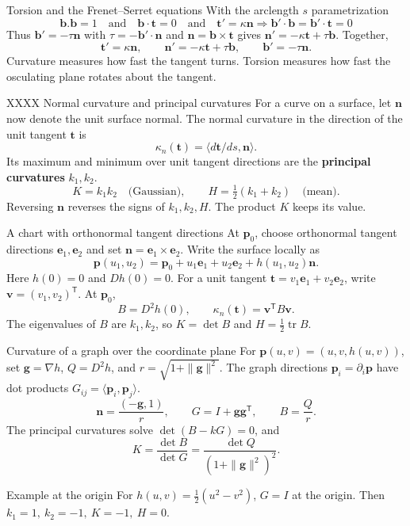 \documentclass[11pt,aspectratio=169]{beamer}
\newcommand{\vect}[1]{\bm{#1}}
\newcommand{\pair}[2]{\langle #1,#2\rangle}
\begin{document}
\begin{frame}{Torsion and the Frenet--Serret equations}
With the arclength $s$ parametrization
 \[
 \boxed{
 	\vect{b}.\vect{b}=1
 \quad \mbox{and} \quad
 \vect{b}\cdot\vect{t}=0
 \quad \mbox{and} \quad
 \vect{t}'=\kappa\vect{n}
 } 
 \Longrightarrow
 \boxed{\vect{b}'\cdot\vect{b}=\vect{b}'\cdot\vect{t}=0}
 \]
Thus \(\vect{b}'=-\tau\vect{n}\) with
\(\tau=-\vect{b}'\cdot\vect{n}\) and 
 \(\vect{n}=\vect{b}\times\vect{t}\) 
gives
\(\vect{n}'=-\kappa\vect{t}+\tau\vect{b}\). Together,
\[
 \boxed{\vect{t}'=\kappa\vect{n},\qquad
        \vect{n}'=-\kappa\vect{t}+\tau\vect{b},\qquad
        \vect{b}'=-\tau\vect{n}.}
\]
Curvature measures how fast the tangent turns. Torsion measures 
how fast the osculating plane rotates about the tangent.
\end{frame}

\begin{frame}{XXXX Normal curvature and principal curvatures}
For a curve on a surface, let \(\vect{n}\) now denote the unit surface normal.
The normal curvature in the direction of the unit tangent \(\vect{t}\) is
\[
    \kappa_n(\vect{t})=\pair{d\vect{t}/ds}{\vect{n}}.
\]
Its maximum and minimum over unit tangent directions are the
\textbf{principal curvatures} \(k_1,k_2\).
\[
    K=k_1k_2 \quad\text{(Gaussian)},\qquad
    H=\tfrac12(k_1+k_2) \quad\text{(mean)}.
\]
Reversing \(\vect{n}\) reverses the signs of \(k_1,k_2,H\).
The product \(K\) keeps its value.
\end{frame}

\begin{frame}{A chart with orthonormal tangent directions}
At \(\vect{p}_0\), choose orthonormal tangent directions
\(\vect{e}_1,\vect{e}_2\) and set \(\vect{n}=\vect{e}_1\times\vect{e}_2\).
Write the surface locally as
\[
 \vect{p}(u_1,u_2)=\vect{p}_0+u_1\vect{e}_1+u_2\vect{e}_2+h(u_1,u_2)\vect{n}.
\]
Here \(h(0)=0\) and \(Dh(0)=0\).
For a unit tangent \(\vect{t}=v_1\vect{e}_1+v_2\vect{e}_2\),
write \(\vect{v}=(v_1,v_2)^{\mathsf T}\). At \(\vect{p}_0\),
\[
    B=D^2h(0),\qquad \kappa_n(\vect{t})=\vect{v}^{\mathsf T}B\vect{v}.
\]
The eigenvalues of \(B\) are \(k_1,k_2\), so \(K=\det B\) and
\(H=\tfrac12\operatorname{tr}B\).
\end{frame}

\begin{frame}{Curvature of a graph over the coordinate plane}
For \(\vect{p}(u,v)=(u,v,h(u,v))\), set
\(\vect{g}=\nabla h\), \(Q=D^2h\), and \(r=\sqrt{1+\|\vect{g}\|^2}\).
The graph directions \(\vect{p}_i=\partial_i\vect{p}\) have dot products
\(G_{ij}=\pair{\vect{p}_i}{\vect{p}_j}\).
\[
    \vect{n}=\frac{(-\vect{g},1)}{r},\qquad
    G=I+\vect{g}\vect{g}^{\mathsf T},\qquad B=\frac{Q}{r}.
\]
The principal curvatures solve \(\det(B-kG)=0\), and
\[
    K=\frac{\det B}{\det G}=\frac{\det Q}{(1+\|\vect{g}\|^2)^2}.
\]
\begin{block}{Example at the origin}
For \(h(u,v)=\tfrac12(u^2-v^2)\), \(G=I\) at the origin.
Then \(k_1=1,\ k_2=-1,\ K=-1,\ H=0\).
\end{block}
\end{frame}
\end{document}
